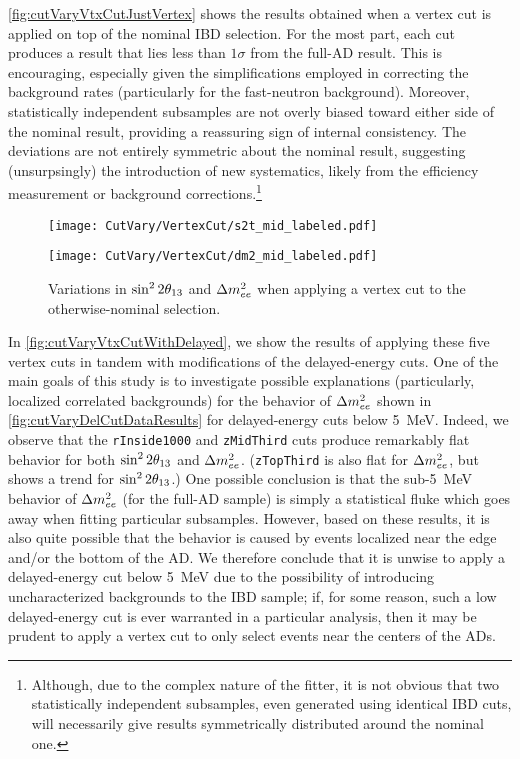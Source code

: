 \documentclass[../thesis.tex]{subfiles}
\begin{document}
\autoref{fig:cutVaryVtxCutJustVertex} shows the results obtained when a vertex cut is applied on top of the nominal IBD selection. For the most part, each cut produces a result that lies less than $1\sigma$ from the full-AD result. This is encouraging, especially given the simplifications employed in correcting the background rates (particularly for the fast-neutron background). Moreover, statistically independent subsamples are not overly biased toward either side of the nominal result, providing a reassuring sign of internal consistency. The deviations are not entirely symmetric about the nominal result, suggesting (unsurpsingly) the introduction of new systematics, likely from the efficiency measurement or background corrections.\footnote{Although, due to the complex nature of the fitter, it is not obvious that two statistically independent subsamples, even generated using identical IBD cuts, will necessarily give results symmetrically distributed around the nominal one.}

\begin{figure}[ht]
  \begin{minipage}{0.47\linewidth}%
    \texttt{[image: CutVary/VertexCut/s2t\_mid\_labeled.pdf]}%
  \end{minipage}%
  \begin{minipage}{0.47\linewidth}%
    \texttt{[image: CutVary/VertexCut/dm2\_mid\_labeled.pdf]}%
  \end{minipage}%
  \caption{Variations in $\sin^2 2\theta_{13}$ and $\Delta m^2_{ee}$ when applying a vertex cut to the otherwise-nominal selection.}
  \label{fig:cutVaryVtxCutJustVertex}
\end{figure}

In \autoref{fig:cutVaryVtxCutWithDelayed}, we show the results of applying these five vertex cuts in tandem with modifications of the delayed-energy cuts. One of the main goals of this study is to investigate possible explanations (particularly, localized correlated backgrounds) for the behavior of $\Delta m^2_{ee}$ shown in \autoref{fig:cutVaryDelCutDataResults} for delayed-energy cuts below 5~MeV. Indeed, we observe that the \texttt{rInside1000} and \texttt{zMidThird} cuts produce remarkably flat behavior for both $\sin^2 2\theta_{13}$ and $\Delta m^2_{ee}$. (\texttt{zTopThird} is also flat for $\Delta m^2_{ee}$, but shows a trend for $\sin^2 2\theta_{13}$.) One possible conclusion is that the sub-5~MeV behavior of $\Delta m^2_{ee}$ (for the full-AD sample) is simply a statistical fluke which goes away when fitting particular subsamples. However, based on these results, it is also quite possible that the behavior is caused by events localized near the edge and/or the bottom of the AD. We therefore conclude that it is unwise to apply a delayed-energy cut below 5~MeV due to the possibility of introducing uncharacterized backgrounds to the IBD sample; if, for some reason, such a low delayed-energy cut is ever warranted in a particular analysis, then it may be prudent to apply a vertex cut to only select events near the centers of the ADs.
\end{document}
